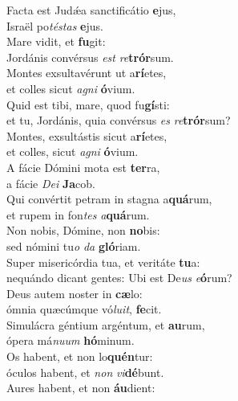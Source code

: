 \evenverse Facta est Judǽa sanctificátio \textbf{e}jus,~\*\\
\evenverse Israël po\textit{té}\textit{stas} \textbf{e}jus.\\
\oddverse Mare vidit, et \textbf{fu}git:~\*\\
\oddverse Jordánis convérsus \textit{est} \textit{re}\textbf{trór}sum.\\
\evenverse Montes exsultavérunt ut a\textbf{rí}etes,~\*\\
\evenverse et colles sicut \textit{a}\textit{gni} \textbf{ó}vium.\\
\oddverse Quid est tibi, mare, quod fu\textbf{gí}sti:~\*\\
\oddverse et tu, Jordánis, quia convérsus \textit{es} \textit{re}\textbf{trór}sum?\\
\evenverse Montes, exsultástis sicut a\textbf{rí}etes,~\*\\
\evenverse et colles, sicut \textit{a}\textit{gni} \textbf{ó}vium.\\
\oddverse A fácie Dómini mota est \textbf{ter}ra,~\*\\
\oddverse a fácie \textit{De}\textit{i} \textbf{Ja}cob.\\
\evenverse Qui convértit petram in stagna a\textbf{quá}rum,~\*\\
\evenverse et rupem in fon\textit{tes} \textit{a}\textbf{quá}rum.\\
\oddverse Non nobis, Dómine, non \textbf{no}bis:~\*\\
\oddverse sed nómini tu\textit{o} \textit{da} \textbf{gló}riam.\\
\evenverse Super misericórdia tua, et veritáte \textbf{tu}a:~\*\\
\evenverse nequándo dicant gentes: Ubi est De\textit{us} \textit{e}\textbf{ó}rum?\\
\oddverse Deus autem noster in \textbf{cæ}lo:~\*\\
\oddverse ómnia quæcúmque vó\textit{lu}\textit{it}, \textbf{fe}cit.\\
\evenverse Simulácra géntium argéntum, et \textbf{au}rum,~\*\\
\evenverse ópera má\textit{nu}\textit{um} \textbf{hó}minum.\\
\oddverse Os habent, et non lo\textbf{quén}tur:~\*\\
\oddverse óculos habent, et \textit{non} \textit{vi}\textbf{dé}bunt.\\
\evenverse Aures habent, et non \textbf{áu}dient:~\*\\
